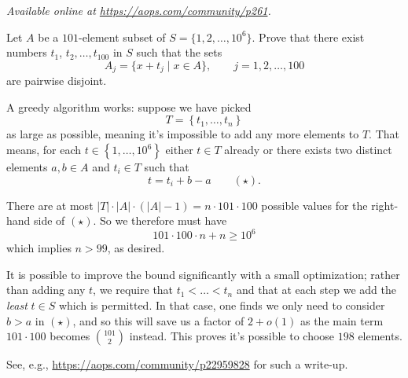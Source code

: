 \textsl{Available online at \url{https://aops.com/community/p261}.}
\begin{mdframed}[style=mdpurplebox,frametitle={Problem statement}]
Let $A$ be a $101$-element subset of $S=\{1,2,\dots,10^6\}$.
Prove that there exist numbers $t_1$, $t_2, \dots, t_{100}$ in $S$ such that the sets
\[ A_j=\{x+t_j\mid x\in A\},\qquad j=1,2,\dots,100  \]
are pairwise disjoint.
\end{mdframed}
A greedy algorithm works: suppose we have picked
\[ T = \left\{ t_1, \dots, t_n \right\} \]
as large as possible, meaning it's impossible to add any more elements to $T$.
That means, for each $t \in \left\{ 1, \dots, 10^6 \right\}$ either $t \in T$ already
or there exists two distinct elements $a, b \in A$ and $t_i \in T$ such that
\[ t = t_i + b - a \qquad (\star).  \]

There are at most
$|T| \cdot |A| \cdot \left( |A|-1 \right) = n \cdot 101 \cdot 100$
possible values for the right-hand side of $(\star)$.
So we therefore must have
\[ 101 \cdot 100 \cdot n + n \ge 10^6 \]
which implies $n > 99$, as desired.

\begin{remark*}
  It is possible to improve the bound significantly with a small optimization;
  rather than adding any $t$, we require that $t_1 < \dots < t_n$
  and that at each step we add the \emph{least} $t \in S$ which is permitted.
  In that case, one finds we only need to consider $b > a$ in $(\star)$,
  and so this will save us a factor of $2+o(1)$
  as the main term $101 \cdot 100$ becomes $\binom{101}{2}$ instead.
  This proves it's possible to choose $198$ elements.

  See, e.g., \url{https://aops.com/community/p22959828} for such a write-up.
\end{remark*}
\pagebreak
